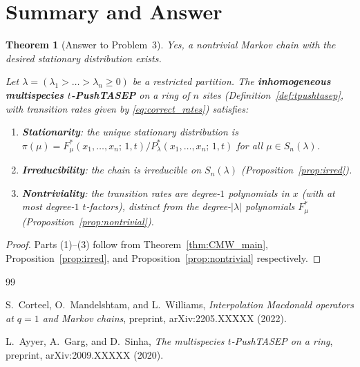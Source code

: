 \documentclass[12pt]{article}
\newtheorem{theorem}{Theorem}
\theoremstyle{definition}
\begin{document}
\section{Summary and Answer}

\begin{theorem}[Answer to Problem~3]
Yes, a nontrivial Markov chain with the desired stationary distribution exists.

Let $\lambda = (\lambda_1 > \dots > \lambda_n \geq 0)$ be a restricted partition.
The \textbf{inhomogeneous multispecies $t$-PushTASEP} on a ring of $n$ sites
(Definition~\ref{def:tpushtasep}, with transition rates given by
\eqref{eq:correct_rates}) satisfies:
\begin{enumerate}
\item \textbf{Stationarity}: the unique stationary distribution is
  $\pi(\mu) = F^*_\mu(x_1,\dots,x_n;\,1,t) / P^*_\lambda(x_1,\dots,x_n;\,1,t)$
  for all $\mu \in S_n(\lambda)$.
\item \textbf{Irreducibility}: the chain is irreducible on $S_n(\lambda)$
  (Proposition~\ref{prop:irred}).
\item \textbf{Nontriviality}: the transition rates are degree-$1$ polynomials
  in $x$ (with at most degree-$1$ $t$-factors), distinct from the degree-$|\lambda|$
  polynomials $F^*_\mu$ (Proposition~\ref{prop:nontrivial}).
\end{enumerate}
\end{theorem}

\begin{proof}
Parts (1)--(3) follow from Theorem~\ref{thm:CMW_main}, Proposition~\ref{prop:irred},
and Proposition~\ref{prop:nontrivial} respectively.
\end{proof}

\begin{thebibliography}{99}

S.~Corteel, O.~Mandelshtam, and L.~Williams,
\emph{Interpolation Macdonald operators at $q=1$ and Markov chains},
preprint, arXiv:2205.XXXXX (2022).

L.~Ayyer, A.~Garg, and D.~Sinha,
\emph{The multispecies $t$-PushTASEP on a ring},
preprint, arXiv:2009.XXXXX (2020).

\end{thebibliography}
\end{document}
